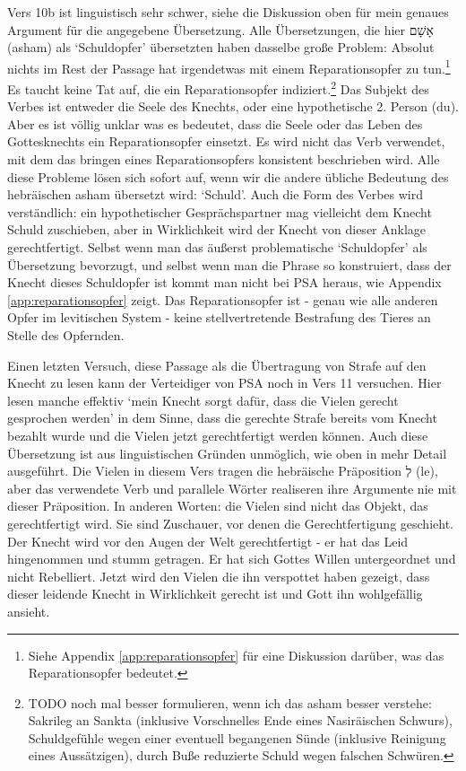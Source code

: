 Vers 10b ist linguistisch sehr schwer, siehe die Diskussion oben für mein genaues Argument für die angegebene Übersetzung.
Alle Übersetzungen, die hier אָשָׁם (asham) als `Schuldopfer' übersetzten haben dasselbe große Problem:
Absolut nichts im Rest der Passage hat irgendetwas mit einem Reparationsopfer zu tun.\footnote{
	Siehe Appendix \ref{app:reparationsopfer} für eine Diskussion darüber, was das Reparationsopfer bedeutet.
}
Es taucht keine Tat auf, die ein Reparationsopfer indiziert.\footnote{
	TODO noch mal besser formulieren, wenn ich das asham besser verstehe:
	Sakrileg an Sankta (inklusive Vorschnelles Ende eines Nasiräischen Schwurs), Schuldgefühle wegen einer eventuell begangenen Sünde (inklusive Reinigung eines Aussätzigen), durch Buße reduzierte Schuld wegen falschen Schwüren.
}
Das Subjekt des Verbes ist entweder die Seele des Knechts, oder eine hypothetische 2. Person (du).
Aber es ist völlig unklar was es bedeutet, dass die Seele oder das Leben des Gottesknechts ein Reparationsopfer einsetzt.
Es wird nicht das Verb verwendet, mit dem das bringen eines Reparationsopfers konsistent beschrieben wird.
Alle diese Probleme lösen sich sofort auf, wenn wir die andere übliche Bedeutung des hebräischen asham übersetzt wird: `Schuld'.
Auch die Form des Verbes wird verständlich:
ein hypothetischer Gesprächspartner mag vielleicht dem Knecht Schuld zuschieben, aber in Wirklichkeit wird der Knecht von dieser Anklage gerechtfertigt.
Selbst wenn man das äußerst problematische `Schuldopfer' als Übersetzung bevorzugt, und selbst wenn man die Phrase so konstruiert, dass der Knecht
dieses Schuldopfer ist kommt man nicht bei PSA heraus, wie Appendix \ref{app:reparationsopfer} zeigt.
Das Reparationsopfer ist - genau wie alle anderen Opfer im levitischen System - keine stellvertretende Bestrafung des Tieres an Stelle des Opfernden.

Einen letzten Versuch, diese Passage als die Übertragung von Strafe auf den Knecht zu lesen kann der Verteidiger von PSA noch in Vers 11 versuchen.
Hier lesen manche effektiv `mein Knecht sorgt dafür, dass die Vielen gerecht gesprochen werden' in dem Sinne, dass die gerechte Strafe bereits vom Knecht bezahlt wurde
und die Vielen jetzt gerechtfertigt werden können.
Auch diese Übersetzung ist aus linguistischen Gründen unmöglich, wie oben in mehr Detail ausgeführt.
Die Vielen in diesem Vers tragen die hebräische Präposition לְ (le), aber das verwendete Verb und parallele Wörter realiseren ihre Argumente nie mit dieser Präposition.
In anderen Worten: die Vielen sind nicht das Objekt, das gerechtfertigt wird.
Sie sind Zuschauer, vor denen die Gerechtfertigung geschieht.
Der Knecht wird vor den Augen der Welt gerechtfertigt - er hat das Leid hingenommen und stumm getragen. Er hat sich Gottes Willen untergeordnet und nicht Rebelliert.
Jetzt wird den Vielen die ihn verspottet haben gezeigt, dass dieser leidende Knecht in Wirklichkeit gerecht ist und Gott ihn wohlgefällig ansieht.


